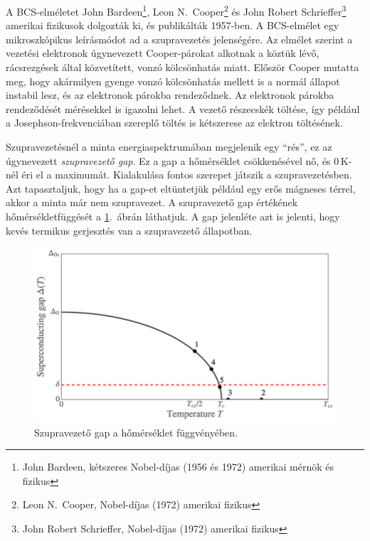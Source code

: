\documentclass[a4paper,12pt,titlepage]{article}
\begin{document}
A BCS-elméletet John Bardeen\footnote{John Bardeen, kétszeres Nobel-díjas (1956 és 1972) amerikai mérnök és fizikus}, Leon N.\ Cooper\footnote{Leon N.\ Cooper, Nobel-díjas (1972) amerikai fizikus} és John Robert Schrieffer\footnote{John Robert Schrieffer, Nobel-díjas (1972) amerikai fizikus} amerikai fizikusok dolgozták ki, és publikálták 1957-ben.  A BCS-elmélet egy mikroszkópikus leírásmódot ad a szupravezetés jelenségére.  Az elmélet szerint a vezetési elektronok úgynevezett Cooper-párokat alkotnak a köztük lévő, rácsrezgések által közvetített, vonzó kölcsönhatás miatt.  Először Cooper mutatta meg, hogy akármilyen gyenge vonzó kölcsönhatás mellett is a normál állapot instabil lesz, és az elektronok párokba rendeződnek.  Az elektronok párokba rendeződését mérésekkel is igazolni lehet.  A vezető részecskék töltése, így például a Josephson-frekvenciában szereplő töltés is kétszerese az elektron töltésének.

Szupravezetésnél a minta energiaspektrumában megjelenik egy \enquote{rés}, ez az úgynevezett \emph{szupravezető gap}.  Ez a gap a hőmérséklet csökkenésével nő, és $0$\,K-nél éri el a maximumát.  Kialakulása fontos szerepet játszik a szupravezetésben.  Azt tapasztaljuk, hogy ha a gap-et eltüntetjük például egy erős mágneses térrel, akkor a minta már nem szupravezet.  A szupravezető gap értékének hőmérsékletfüggését a \ref{sc-gap}.\ ábrán láthatjuk.  A gap jelenléte azt is jelenti, hogy kevés termikus gerjesztés van a szupravezető állapotban.

\begin{figure}[h!]
	\centering
	\includegraphics[width=12cm]{sc_gap.png}
	\caption[]{Szupravezető gap a hőmérséklet függvényében.\footnotemark}
	\label{sc-gap}
\end{figure}
\end{document}
